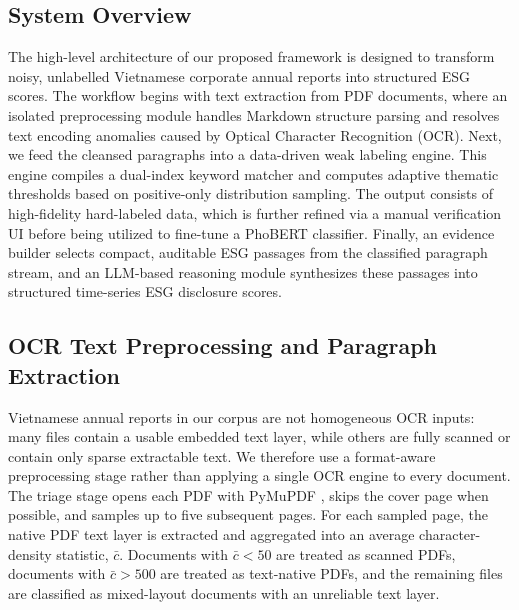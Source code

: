 \documentclass{article}
\theoremstyle{plain}
\theoremstyle{definition}
\theoremstyle{remark}
\begin{document}
\subsection{System Overview}
The high-level architecture of our proposed framework is designed to transform noisy, unlabelled Vietnamese corporate annual reports into structured ESG scores. 
The workflow begins with text extraction from PDF documents, where an isolated preprocessing module handles Markdown structure parsing and resolves text encoding anomalies caused by Optical Character Recognition (OCR). 
Next, we feed the cleansed paragraphs into a data-driven weak labeling engine. This engine compiles a dual-index keyword matcher and computes adaptive thematic thresholds based on positive-only distribution sampling. The output consists of high-fidelity hard-labeled data, which is further refined via a manual verification UI before being utilized to fine-tune a PhoBERT classifier. Finally, an evidence builder selects compact, auditable ESG passages from the classified paragraph stream, and an LLM-based reasoning module synthesizes these passages into structured time-series ESG disclosure scores.


\subsection{OCR Text Preprocessing and Paragraph Extraction}

Vietnamese annual reports in our corpus are not homogeneous OCR inputs: many files contain a usable embedded text layer, while others are fully scanned or contain only sparse extractable text. We therefore use a format-aware preprocessing stage rather than applying a single OCR engine to every document. The triage stage opens each PDF with PyMuPDF \citep{pymupdf}, skips the cover page when possible, and samples up to five subsequent pages. For each sampled page, the native PDF text layer is extracted and aggregated into an average character-density statistic, $\bar{c}$. Documents with $\bar{c}<50$ are treated as scanned PDFs, documents with $\bar{c}>500$ are treated as text-native PDFs, and the remaining files are classified as mixed-layout documents with an unreliable text layer.
\end{document}
